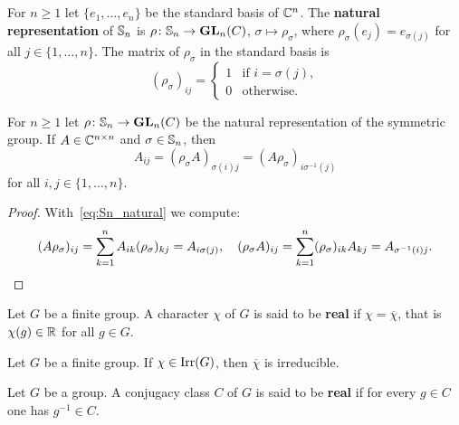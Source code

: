 \chapter{}


For $n\geq1$ let $\{e_1,\dots,e_n\}$ be the standard basis of $\mathbb{C}^n$.  
The \textbf{natural representation} of $\mathbb{S}_n$ is 
$\rho\colon\mathbb{S}_n\to\mathbf{GL}_n(C)$, $\sigma\mapsto\rho_{\sigma}$, 
where $\rho_\sigma(e_j)=e_{\sigma(j)}$ for all $j\in\{1,\dots,n\}$. 
The matrix of $\rho_\sigma$ in the standard basis is  
\begin{equation}
    \label{eq:Sn_natural}
    (\rho_\sigma)_{ij}=\begin{cases}
      1 & \text{if $i=\sigma(j)$},\\
      0 & \text{otherwise}.
    \end{cases}
\end{equation}

\begin{lemma}
	\label{lem:permutaciones}
	For $n\geq1$ let $\rho\colon\mathbb{S}_n\to\mathbf{GL}_n(C)$ be the natural 
	representation of the symmetric group. 
	If $A\in\mathbb{C}^{n\times n}$ and $\sigma\in\mathbb{S}_n$, then
	\[
		A_{ij}=(\rho_{\sigma}A)_{\sigma(i)j}=(A\rho_{\sigma})_{i\sigma^{-1}(j)}
	\]
    for all $i,j\in\{1,\dots,n\}$.
\end{lemma}

\begin{proof}
	With~\eqref{eq:Sn_natural} we compute:
	\[
		(A\rho_{\sigma})_{ij}=\sum_{k=1}^n A_{ik}(\rho_{\sigma})_{kj}=A_{i\sigma(j)},
		\quad
		(\rho_\sigma A)_{ij}=\sum_{k=1}^n (\rho_\sigma)_{ik}A_{kj}=A_{\sigma^{-1}(i)j}.\qedhere
	\]
\end{proof}

\begin{definition}
  Let $G$ be a finite group. A character $\chi$ of $G$ is said to be
  \textbf{real} if
  $\chi=\overline{\chi}$, that is $\chi(g)\in\mathbb{R}$ for all $g\in G$. 
\end{definition}

\begin{exercise}
	\label{xca:chi_irreducible}
	Let $G$ be a finite group. If $\chi\in\operatorname{Irr}(G)$, then 
	$\overline{\chi}$ is irreducible.
\end{exercise}

\begin{definition}
  Let $G$ be a group. A conjugacy class $C$ of $G$ is said to be
  \textbf{real} if for every $g\in C$ one has $g^{-1}\in C$. 
\end{definition}

